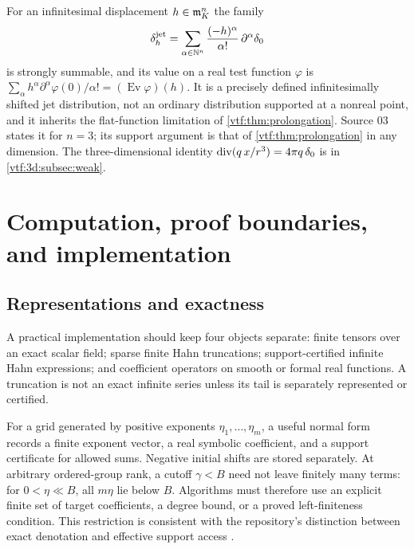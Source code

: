 \documentclass[11pt,letterpaper]{article}
\theoremstyle{definition}
\theoremstyle{remark}
\newcommand{\ev}{\operatorname{Ev}}\newcommand{\jet}{\operatorname{J}}
\begin{document}
For an infinitesimal displacement $h\in\mathfrak m_K^n$ the family
\[
 \delta_h^{\mathrm{jet}}
 =\sum_{\alpha\in\mathbb N^n}\frac{(-h)^\alpha}{\alpha!}\,\partial^\alpha\delta_0
\]
is strongly summable, and its value on a real test function $\varphi$ is
$\sum_\alpha h^\alpha\partial^\alpha\varphi(0)/\alpha!=(\ev\varphi)(h)$. It is a
precisely defined infinitesimally shifted jet distribution, not an ordinary
distribution supported at a nonreal point, and it inherits the flat-function
limitation of \cref{vtf:thm:prolongation}. Source 03 states it for $n=3$; its
support argument is that of \cref{vtf:thm:prolongation} in any dimension. The
three-dimensional identity $\operatorname{div}(q\,x/r^3)=4\pi q\,\delta_0$ is in
\cref{vtf:3d:subsec:weak}.

\section{Computation, proof boundaries, and implementation}\label{vtf:sec:implementation}

\subsection{Representations and exactness}

A practical implementation should keep four objects separate: finite tensors
over an exact scalar field; sparse finite Hahn truncations; support-certified
infinite Hahn expressions; and coefficient operators on smooth or formal
real functions. A truncation is not an exact infinite series unless its tail
is separately represented or certified.

For a grid generated by positive exponents $\eta_1,\ldots,\eta_m$, a useful
normal form records a finite exponent vector, a real symbolic coefficient,
and a support certificate for allowed sums. Negative initial shifts are
stored separately. At arbitrary ordered-group rank, a cutoff $\gamma<B$
need not leave finitely many terms: for $0<\eta\ll B$, all $m\eta$ lie
below $B$. Algorithms must therefore use an explicit finite set of target
coefficients, a degree bound, or a proved left-finiteness condition. This
restriction is consistent with the repository's distinction between exact
denotation and effective support access \cite{Repo}.
\end{document}
